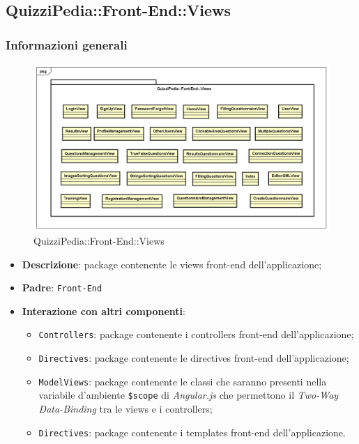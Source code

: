 \newpage

\subsection{QuizziPedia::Front-End::Views}
\subsubsection{Informazioni generali}
\label{QuizziPedia::Front-End::Views}
\begin{figure}
	\centering
	\includegraphics[scale=0.45]{UML/Package/QuizziPedia_Front-End_Views.png}
	\caption{QuizziPedia::Front-End::Views}
\end{figure}
\begin{itemize}
	\item \textbf{Descrizione}: package contenente le views front-end dell'applicazione;
	\item \textbf{Padre}: \texttt{Front-End}
	\item \textbf{Interazione con altri componenti}:
	\begin{itemize}
		\item \texttt{Controllers}: package contenente i controllers front-end dell'applicazione;
		\item \texttt{Directives}: package contenente le directives front-end dell'applicazione;
		\item \texttt{ModelViews}: package contenente le classi che saranno presenti nella variabile d'ambiente \texttt{\$scope} di \textit{Angular.js} che permettono il \textit{Two-Way Data-Binding} tra le views e i controllers;
		\item \texttt{Directives}: package contenente i templates front-end dell'applicazione.
	\end{itemize}
\end{itemize}
